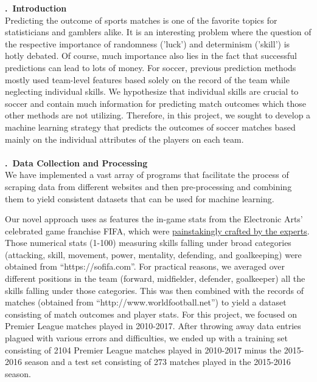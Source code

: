 \documentclass[a4paper,11pt,table]{article}
\renewcommand{\section}[1]{\stepcounter{section}\noindent\textbf{\arabic{section}.~#1}\\}
\begin{document}
\section{Introduction}
Predicting the outcome of sports matches is one of the favorite topics for statisticians and gamblers alike. It is an interesting problem where the question of the respective importance of randomness ('luck') and determinism ('skill') is hotly debated. Of course, much importance also lies in the fact that successful predictions can lead to lots of money. For soccer, previous prediction methods mostly used team-level features based solely on the record of the team while neglecting individual skills. We hypothesize that individual skills are crucial to soccer and contain much information for predicting match outcomes which those other methods are not utilizing. Therefore, in this project, we sought to develop a machine learning strategy that predicts the outcomes of soccer matches based mainly on the individual attributes of the players on each team. \\
~\\
\section{Data Collection and Processing}
We have implemented a vast array of programs that facilitate the process of scraping data from different websites and then pre-processing and combining them to yield consistent datasets that can be used for machine learning.

Our novel approach uses as features the in-game stats from the Electronic Arts' celebrated game franchise FIFA, which were \href{http://www.espnfc.us/blog/espn-fc-united-blog/68/post/2959703/fifa-17-player-ratings-system-blends-advanced-stats-and-subjective-scouting}{painstakingly crafted by the experts}. Those numerical stats (1-100) measuring skills falling under broad categories (attacking, skill, movement, power, mentality, defending, and goalkeeping) were obtained from ``https://sofifa.com''. For practical reasons, we averaged over different positions in the team (forward, midfielder, defender, goalkeeper) all the skills falling under those categories. This was then combined with the records of matches (obtained from ``http://www.worldfootball.net'') to yield a dataset consisting of match outcomes and player stats. For this project, we focused on Premier League matches played in 2010-2017. After throwing away data entries plagued with various errors and difficulties, we ended up with a training set consisting of 2104 Premier League matches played in 2010-2017 minus the 2015-2016 season and a test set consisting of 273 matches played in the 2015-2016 season.
\end{document}
